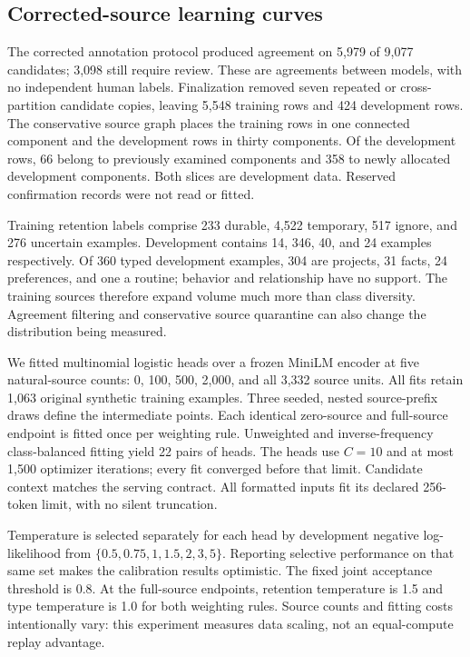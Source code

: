 \subsection{Corrected-source learning curves}

The corrected annotation protocol produced agreement on 5,979 of 9,077 candidates;
3,098 still require review. These are agreements between models, with no
independent human labels. Finalization removed seven repeated or cross-partition
candidate copies, leaving 5,548 training rows and 424 development rows. The
conservative source graph places the training rows in one connected component
and the development rows in thirty components. Of the development rows, 66
belong to previously examined components and 358 to newly allocated development
components. Both slices are development data. Reserved confirmation records
were not read or fitted.

Training retention labels comprise 233 durable, 4,522 temporary, 517 ignore,
and 276 uncertain examples. Development contains 14, 346, 40, and 24 examples
respectively. Of 360 typed development examples, 304 are projects, 31 facts,
24 preferences, and one a routine; behavior and relationship have no support.
The training sources therefore expand volume much more than class diversity.
Agreement filtering and conservative source quarantine can also change the
distribution being measured.

We fitted multinomial logistic heads over a frozen MiniLM encoder at five
natural-source counts: 0, 100, 500, 2,000, and all 3,332 source units. All fits
retain 1,063 original synthetic training examples. Three seeded, nested
source-prefix draws define the intermediate points. Each identical zero-source
and full-source endpoint is fitted once per weighting rule. Unweighted and
inverse-frequency class-balanced fitting yield 22 pairs of heads. The heads
use $C=10$ and at most 1,500 optimizer iterations; every fit converged before
that limit. Candidate context matches the serving contract. All formatted inputs fit its
declared 256-token limit, with no silent truncation.

Temperature is selected separately for each head by development negative
log-likelihood from $\{0.5,0.75,1,1.5,2,3,5\}$. Reporting selective performance
on that same set makes the calibration results optimistic. The fixed joint
acceptance threshold is 0.8. At the full-source endpoints, retention temperature
is 1.5 and type temperature is 1.0 for both weighting rules. Source counts and
fitting costs intentionally vary: this experiment measures data scaling, not
an equal-compute replay advantage.

